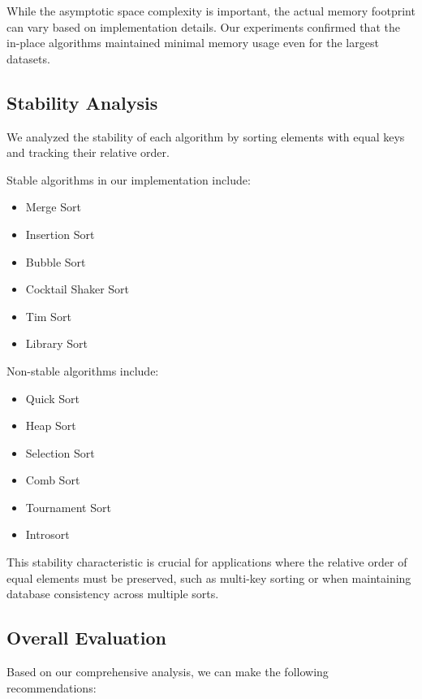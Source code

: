 \documentclass[sigconf]{acmart}
\begin{document}
While the asymptotic space complexity is important, the actual memory footprint can vary based on implementation details. Our experiments confirmed that the in-place algorithms maintained minimal memory usage even for the largest datasets.

\subsection{Stability Analysis}
We analyzed the stability of each algorithm by sorting elements with equal keys and tracking their relative order.

Stable algorithms in our implementation include:
\begin{itemize}
    \item Merge Sort
    \item Insertion Sort
    \item Bubble Sort
    \item Cocktail Shaker Sort
    \item Tim Sort
    \item Library Sort
\end{itemize}

Non-stable algorithms include:
\begin{itemize}
    \item Quick Sort
    \item Heap Sort
    \item Selection Sort
    \item Comb Sort
    \item Tournament Sort
    \item Introsort
\end{itemize}

This stability characteristic is crucial for applications where the relative order of equal elements must be preserved, such as multi-key sorting or when maintaining database consistency across multiple sorts.

\subsection{Overall Evaluation}
Based on our comprehensive analysis, we can make the following recommendations:
\end{document}

